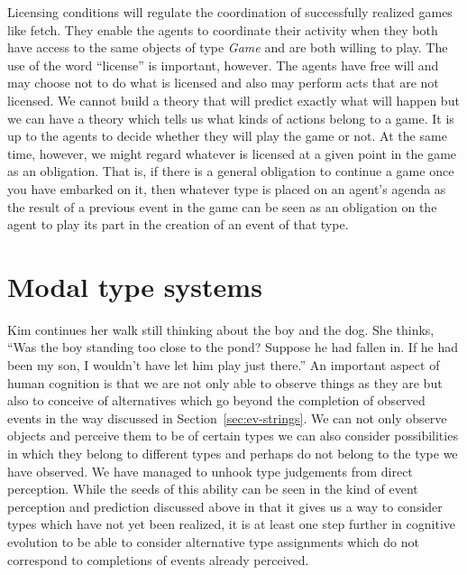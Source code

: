 Licensing conditions will regulate the coordination of
successfully realized games like fetch.  They enable the agents to
coordinate their activity when they both have access to the same
objects of type \textit{Game} and are both willing to play.  The use
of the word ``license'' is important, however.  The agents have free
will and may choose not to do what is licensed and also may perform
acts that are not licensed.  We cannot build a theory that will
predict exactly what will happen but we can have a theory which tells
us what kinds of actions belong to a game.  It is up to the agents to
decide whether they will play the game or not.  At the same time,
however, we might regard whatever is licensed at a given point in the
game as an obligation.  That is, if there is a general obligation to
continue a game once you have embarked on it, then whatever type is
placed on an agent's agenda as the result of a previous event in the
game can be seen as an obligation on the agent to play its part in the
creation of an event of that type.



 

\section{Modal type systems}
\label{sec:percint-modal}

Kim continues her walk still thinking about the boy and the dog.  She
thinks,  ``Was
the boy standing too close to the pond?  Suppose he had fallen in.  If
he had been my son, I wouldn't have let him play just there.'' An
important aspect of human cognition is that we are not only able to
observe things as they are but also to conceive of alternatives which
go beyond the completion of observed events in the way discussed in
Section~\ref{sec:ev-strings}. We can not only observe objects and
perceive them to be of certain types we can also consider
possibilities in which they belong to different types and perhaps do
not belong to the type we have observed.  We have managed to unhook
type judgements from direct perception.  While the seeds of this
ability can be seen in the kind of event perception and prediction
discussed above in that it gives us a way to consider types which have
not yet been realized, it is at least one step further in cognitive
evolution to be able to consider alternative type assignments which do
not correspond to completions of events already perceived.


